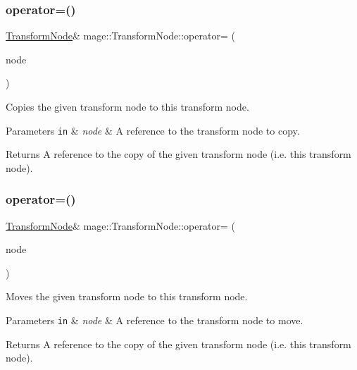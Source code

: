 \subsubsection{\texorpdfstring{operator=()}{operator=()}\hspace{0.1cm}{\footnotesize\ttfamily [1/2]}}
{\footnotesize\ttfamily \hyperlink{classmage_1_1_transform_node}{Transform\+Node}\& mage\+::\+Transform\+Node\+::operator= (\begin{DoxyParamCaption}\item[{const \hyperlink{classmage_1_1_transform_node}{Transform\+Node} \&}]{node }\end{DoxyParamCaption})\hspace{0.3cm}{\ttfamily [delete]}}

Copies the given transform node to this transform node.


\begin{DoxyParams}[1]{Parameters}
\mbox{\tt in}  & {\em node} & A reference to the transform node to copy. \\
\hline
\end{DoxyParams}
\begin{DoxyReturn}{Returns}
A reference to the copy of the given transform node (i.\+e. this transform node). 
\end{DoxyReturn}
\hypertarget{classmage_1_1_transform_node_a8dcd5a36ad95917216df628d309b294d}{}\label{classmage_1_1_transform_node_a8dcd5a36ad95917216df628d309b294d} 
\subsubsection{\texorpdfstring{operator=()}{operator=()}\hspace{0.1cm}{\footnotesize\ttfamily [2/2]}}
{\footnotesize\ttfamily \hyperlink{classmage_1_1_transform_node}{Transform\+Node}\& mage\+::\+Transform\+Node\+::operator= (\begin{DoxyParamCaption}\item[{\hyperlink{classmage_1_1_transform_node}{Transform\+Node} \&\&}]{node }\end{DoxyParamCaption})\hspace{0.3cm}{\ttfamily [delete]}}

Moves the given transform node to this transform node.


\begin{DoxyParams}[1]{Parameters}
\mbox{\tt in}  & {\em node} & A reference to the transform node to move. \\
\hline
\end{DoxyParams}
\begin{DoxyReturn}{Returns}
A reference to the copy of the given transform node (i.\+e. this transform node). 
\end{DoxyReturn}
\hypertarget{classmage_1_1_transform_node_aae7e3f918bcf38bd16db8475c7797c0b}{}\label{classmage_1_1_transform_node_aae7e3f918bcf38bd16db8475c7797c0b} 
